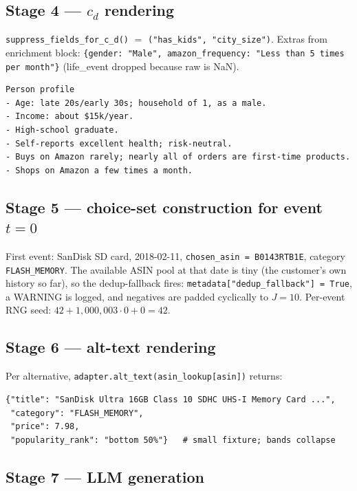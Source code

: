 \documentclass[11pt,a4paper]{article}
\begin{document}
\subsection{Stage 4 — $c_d$ rendering}

\texttt{suppress\_fields\_for\_c\_d()} $=$
\texttt{("has\_kids", "city\_size")}. Extras from enrichment block:
\texttt{\{gender: "Male", amazon\_frequency: "Less than 5 times per
month"\}} (life\_event dropped because raw is NaN).

\begin{lstlisting}[basicstyle=\ttfamily\footnotesize]
Person profile
- Age: late 20s/early 30s; household of 1, as a male.
- Income: about $15k/year.
- High-school graduate.
- Self-reports excellent health; risk-neutral.
- Buys on Amazon rarely; nearly all of orders are first-time products.
- Shops on Amazon a few times a month.
\end{lstlisting}

\subsection{Stage 5 — choice-set construction for event $t = 0$}

First event: SanDisk SD card, 2018-02-11, \texttt{chosen\_asin =
B0143RTB1E}, category \texttt{FLASH\_MEMORY}. The available ASIN
pool at that date is tiny (the customer's own history so far), so
the dedup-fallback fires: \texttt{metadata["dedup\_fallback"] =
True}, a WARNING is logged, and negatives are padded cyclically to
$J = 10$. Per-event RNG seed:
$42 + 1{,}000{,}003 \cdot 0 + 0 = 42$.

\subsection{Stage 6 — alt-text rendering}

Per alternative, \texttt{adapter.alt\_text(asin\_lookup[asin])}
returns:
\begin{lstlisting}[basicstyle=\ttfamily\footnotesize]
{"title": "SanDisk Ultra 16GB Class 10 SDHC UHS-I Memory Card ...",
 "category": "FLASH_MEMORY",
 "price": 7.98,
 "popularity_rank": "bottom 50%"}   # small fixture; bands collapse
\end{lstlisting}

\subsection{Stage 7 — LLM generation}
\end{document}

